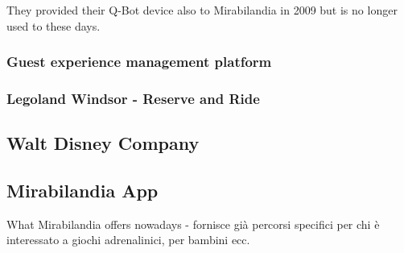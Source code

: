 They provided their Q-Bot device also to Mirabilandia in 2009 but is no longer used to these days.

\subsubsection{Guest experience management platform}\label{subsec:guest-experience-management-platform}
\subsubsection{Legoland Windsor - Reserve and Ride}\label{subsec:legoland-windsor---reserve-and-ride}

\subsection{Walt Disney Company}\label{subsec:walt-disney-company}

\subsection{Mirabilandia App}\label{subsec:mirabilandia-app}
What Mirabilandia offers nowadays
- fornisce già percorsi specifici per chi è interessato a giochi adrenalinici, per bambini ecc.


